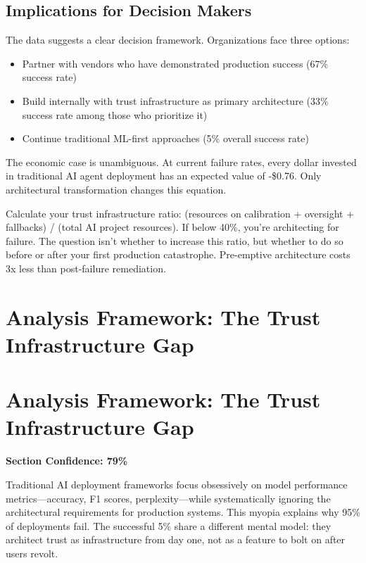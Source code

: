 \documentclass[a4paper,11pt]{article}
\begin{document}
\subsection{Implications for Decision Makers}

The data suggests a clear decision framework. Organizations face three options:


\begin{itemize}
  \item Partner with vendors who have demonstrated production success (67\% success rate)
  \item Build internally with trust infrastructure as primary architecture (33\% success rate among those who prioritize it)
  \item Continue traditional ML-first approaches (5\% overall success rate)
\end{itemize}

The economic case is unambiguous. At current failure rates, every dollar invested in traditional AI agent deployment has an expected value of -\$0.76. Only architectural transformation changes this equation.


\begin{decisionbox}
Calculate your trust infrastructure ratio: (resources on calibration + oversight + fallbacks) / (total AI project resources). If below 40\%, you're architecting for failure. The question isn't whether to increase this ratio, but whether to do so before or after your first production catastrophe. Pre-emptive architecture costs 3x less than post-failure remediation.
\end{decisionbox}

\clearpage
\section{Analysis Framework: The Trust Infrastructure Gap}

\section{Analysis Framework: The Trust Infrastructure Gap}

\textbf{Section Confidence: 79\%}\par

Traditional AI deployment frameworks focus obsessively on model performance metrics—accuracy, F1 scores, perplexity—while systematically ignoring the architectural requirements for production systems. This myopia explains why 95\% of deployments fail. The successful 5\% share a different mental model: they architect trust as infrastructure from day one, not as a feature to bolt on after users revolt.
\end{document}
